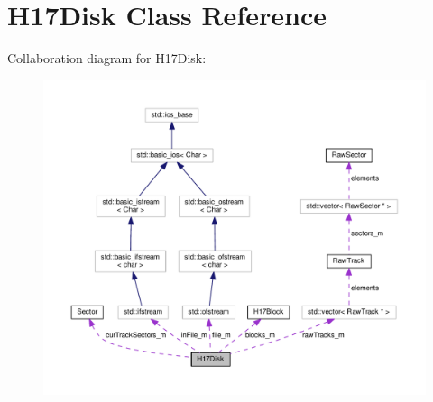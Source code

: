 \hypertarget{classH17Disk}{}\section{H17\+Disk Class Reference}
\label{classH17Disk}


Collaboration diagram for H17\+Disk\+:\nopagebreak
\begin{figure}[H]
\begin{center}
\leavevmode
\includegraphics[width=350pt]{classH17Disk__coll__graph}
\end{center}
\end{figure}
